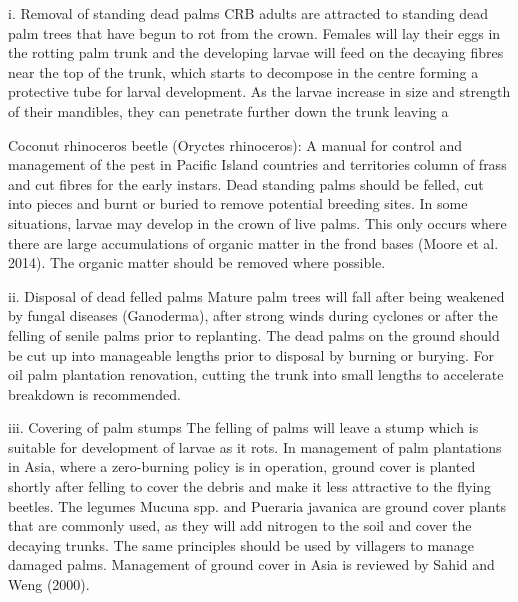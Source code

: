 \documentclass[twocolumn,letterpaper]{scrartcl}
\begin{document}
i.  Removal of standing dead palms
CRB adults are attracted to standing dead palm trees that have begun to rot from the crown. Females will lay 
their eggs in the rotting palm trunk and the developing larvae will feed on the decaying fibres near the top of 
the trunk, which starts to decompose in the centre forming a protective tube for larval development. As the 
larvae increase in size and strength of their mandibles, they can penetrate further down the trunk leaving a 

Coconut rhinoceros beetle (Oryctes rhinoceros): A manual for control and management of the pest in Pacific Island countries and territoriescolumn of frass and cut fibres for the early instars. Dead standing palms should be felled, cut into pieces and 
burnt or buried to remove potential breeding sites. In some situations, larvae may develop in the crown of live 
palms. This only occurs where there are large accumulations of organic matter in the frond bases (Moore et al. 
2014). The organic matter should be removed where possible.

ii.  Disposal of dead felled palms
Mature palm trees will fall after being weakened by fungal diseases (Ganoderma), after strong winds during 
cyclones or after the felling of senile palms prior to replanting. The dead palms on the ground should be cut up 
into manageable lengths prior to disposal by burning or burying. For oil palm plantation renovation, cutting 
the trunk into small lengths to accelerate breakdown is recommended.

iii.  Covering of palm stumps
The felling of palms will leave a stump which is suitable for development of larvae as it rots. In management 
of palm plantations in Asia, where a zero-burning policy is in operation, ground cover is planted shortly after 
felling to cover the debris and make it less attractive to the flying beetles. The legumes Mucuna spp. and Pueraria 
javanica are ground cover plants that are commonly used, as they will add nitrogen to the soil and cover the 
decaying trunks. The same principles should be used by villagers to manage damaged palms. Management of 
ground cover in Asia is reviewed by Sahid and Weng (2000).
\end{document}
